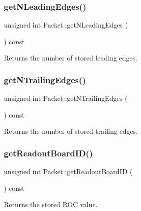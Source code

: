 \subsubsection{\texorpdfstring{get\+N\+Leading\+Edges()}{getNLeadingEdges()}}
{\footnotesize\ttfamily unsigned int Packet\+::get\+N\+Leading\+Edges (\begin{DoxyParamCaption}{ }\end{DoxyParamCaption}) const\hspace{0.3cm}{\ttfamily [inline]}}



Returns the number of stored leading edges. 

\mbox{\label{class_packet_aed7b21042c14e00546a2f4600d3b57d1}} 
\subsubsection{\texorpdfstring{get\+N\+Trailing\+Edges()}{getNTrailingEdges()}}
{\footnotesize\ttfamily unsigned int Packet\+::get\+N\+Trailing\+Edges (\begin{DoxyParamCaption}{ }\end{DoxyParamCaption}) const\hspace{0.3cm}{\ttfamily [inline]}}



Returns the number of stored trailing edges. 

\mbox{\label{class_packet_a85eb57c2213797b64d6102bff9311e1b}} 
\subsubsection{\texorpdfstring{get\+Readout\+Board\+I\+D()}{getReadoutBoardID()}}
{\footnotesize\ttfamily unsigned int Packet\+::get\+Readout\+Board\+ID (\begin{DoxyParamCaption}{ }\end{DoxyParamCaption}) const\hspace{0.3cm}{\ttfamily [inline]}}



Returns the stored R\+OC value. 

